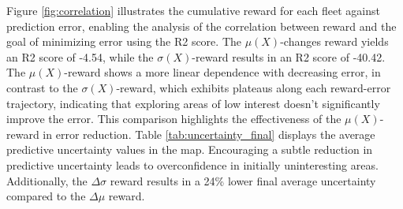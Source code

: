 \documentclass[journal]{IEEEtran}
\begin{document}


Figure \ref{fig:correlation} illustrates the cumulative reward for each fleet against prediction error, enabling the analysis of the correlation between reward and the goal of minimizing error using the R2 score. The $\mu(X)$-changes reward yields an R2 score of -4.54, while the $\sigma(X)$-reward results in an R2 score of -40.42. The $\mu(X)$-reward shows a more linear dependence with decreasing error, in contrast to the $\sigma(X)$-reward, which exhibits plateaus along each reward-error trajectory, indicating that exploring areas of low interest doesn't significantly improve the error. This comparison highlights the effectiveness of the $\mu(X)$-reward in error reduction. Table \ref{tab:uncertainty_final} displays the average predictive uncertainty values in the map. Encouraging a subtle reduction in predictive uncertainty leads to overconfidence in initially uninteresting areas. Additionally, the $\Delta \sigma$ reward results in a 24\% lower final average uncertainty compared to the $\Delta \mu$ reward.
\end{document}

